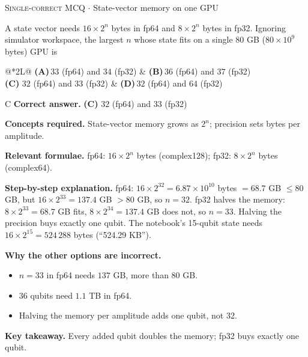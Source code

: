 \documentclass[11pt,a4paper]{article}
\newcommand{\optlabel}[1]{\textbf{(#1)}}
\newcommand{\correctlabel}[1]{\textcolor{okgreen}{\textbf{(#1)}\,\ding{51}}}
\newenvironment{qitem}[1]{\begin{list}{}{\setlength{\leftmargin}{3.3em}\setlength{\labelwidth}{3.1em}%
  \setlength{\labelsep}{0.2em}\setlength{\topsep}{3pt}\setlength{\parsep}{3pt}}\item[\textbf{Q.#1}\hfill]}{\end{list}}
\newcommand{\qsep}{\par\vspace{2pt}{\color{black!15}\hrule}\vspace{4pt}}
\newcommand{\qmeta}[2]{{\footnotesize\color{black!60}\textsc{#1} \;$\cdot$\; #2}\par}
\begin{document}
\begin{qitem}{32}
\qmeta{Single-correct MCQ}{State-vector memory on one GPU}
A state vector needs $16 \times 2^n$ bytes in fp64 and $8\times 2^n$ bytes in fp32. Ignoring simulator workspace, the
largest $n$ whose state fits on a single 80 GB ($80\times10^9$ bytes) GPU is
\par\smallskip\noindent\begin{tabularx}{\linewidth}{@{}*{2}{L}@{}}
\optlabel{A}\,$33$ (fp64) and $34$ (fp32) & \optlabel{B}\,$36$ (fp64) and $37$ (fp32) \\[3pt]
\correctlabel{C}\,$32$ (fp64) and $33$ (fp32) & \optlabel{D}\,$32$ (fp64) and $64$ (fp32)
\end{tabularx}
\end{qitem}
\begin{solbox}{C}
\textbf{\color{brand}Correct answer.} \textcolor{okgreen}{\textbf{(C)}} $32$ (fp64) and $33$ (fp32)

\textbf{\color{brand}Concepts required.} State-vector memory grows as $2^n$; precision sets bytes per amplitude.

\textbf{\color{brand}Relevant formulae.} fp64: $16\times2^n$ bytes (complex128); fp32: $8\times2^n$ bytes (complex64).

\textbf{\color{brand}Step-by-step explanation.} fp64: $16\times2^{32} = 6.87\times10^{10}$ bytes $= 68.7$ GB $\le 80$ GB, but $16\times2^{33} = 137.4$ GB $> 80$ GB, so $n = 32$.
fp32 halves the memory: $8\times2^{33} = 68.7$ GB fits, $8\times2^{34} = 137.4$ GB does not, so $n = 33$.
Halving the precision buys exactly one qubit. The notebook's 15-qubit state needs $16\times2^{15} = 524\,288$ bytes (``524.29 KB'').

\textbf{\color{brand}Why the other options are incorrect.}
\begin{itemize}[leftmargin=2.4em, itemsep=1pt, topsep=2pt]
\item[\textbf{(A)}] $n = 33$ in fp64 needs $137$ GB, more than 80 GB.
\item[\textbf{(B)}] $36$ qubits need $1.1$ TB in fp64.
\item[\textbf{(D)}] Halving the memory per amplitude adds one qubit, not 32.
\end{itemize}
\textbf{\color{brand}Key takeaway.} Every added qubit doubles the memory; fp32 buys exactly one qubit.
\end{solbox}
\qsep
\end{document}
